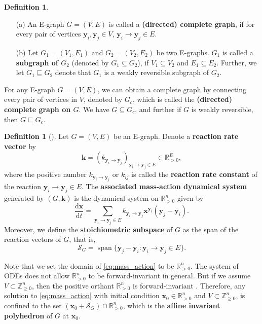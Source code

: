 \documentclass[11pt]{article}
\theoremstyle{plain}
\theoremstyle{definition}
\newtheorem{definition}[theorem]{Definition}
\theoremstyle{remark}
\newcommand\RR{\mathbb{R}}
\newcommand\by{\boldsymbol{y}}
\newcommand\bk{\boldsymbol{k}}
\newcommand\bx{\boldsymbol{x}}
\newcommand{\mSG}{\mathcal{S}_G}
\newcommand{\defi}{\textbf}
\DeclareMathOperator{\spn}{span}
\begin{document}
\begin{definition}
\begin{enumerate}
\item[(a)] An E-graph $G=(V, E)$ is called a \defi{(directed) complete graph}, if for every pair of vertices $\by_i, \by_j \in V$, $\by_i \rightarrow \by_j \in E$. 

\item[(b)] 
Let $G_1 = (V_1, E_1)$ and $G_2 = (V_2, E_2)$ be two E-graphs. 
$G_1$ is called a \defi{subgraph of $G_2$} (denoted by $G_1 \subseteq G_2$), if $V_1 \subseteq V_2$ and $E_1 \subseteq E_2$. 
Further, we let $G_1 \sqsubseteq G_2$ denote that $G_1$ is a weakly reversible subgraph of $G_2$.
\end{enumerate}
\end{definition}

For any E-graph $G=(V, E)$, we can obtain a complete graph by connecting every pair of vertices in $V$, denoted by $G_c$, which is called the \defi{(directed) complete graph on $G$}.
We have $G \subseteq G_c$, and further if $G$ is weakly reversible, then $G \sqsubseteq G_c$.

\begin{definition}[\cite{yu2018mathematical,feinberg1979lectures}]
Let $G=(V, E)$ be an E-graph. 
Denote a \defi{reaction rate vector} by 
$$
\bk = (k_{\by_i \rightarrow \by_j})_{\by_i \rightarrow \by_j \in E} \in \mathbb{R}_{>0}^{E},
$$
where the positive number $k_{\by_i \rightarrow \by_j}$ or $k_{ij}$ is called the \defi{reaction rate constant} of the reaction $\by_i \rightarrow \by_j \in E$. The \defi{associated mass-action dynamical system} generated by $(G, \bk)$ is the dynamical system on  $\RR_{>0}^n$ given by
\begin{equation} \label{eq:mass_action}
 \frac{\mathrm{d} \bx}{\mathrm{d} t} 
= \sum_{\by_i \rightarrow \by_j \in E}k_{\by_i \rightarrow \by_j} \bx^{\by_i}(\by_j - \by_i).
\end{equation}
Moreover, we define the \defi{stoichiometric subspace} of $G$ as the span of the reaction vectors  of $G$, that is, 
\begin{equation}
\mSG = \spn \{ \by_j - \by_i: \by_i \rightarrow \by_j \in E \}.
\end{equation}
\end{definition}

Note that we set the domain of \eqref{eq:mass_action} to be $\mathbb{R}_{>0}^n$.  The system of ODEs does not allow
$\mathbb{R}_{>0}^n$ to be forward-invariant in general. But if we assume $V \subset \mathbb{Z}_{\geq 0}^n$, then the positive orthant $\mathbb{R}_{>0}^n$ is forward-invariant \cite{sontag2001structure}. 
Therefore, any solution to \eqref{eq:mass_action} with initial condition $\bx_0 \in \mathbb{R}_{>0}^n$ and $V \subset \mathbb{Z}_{\geq 0}^n$, is confined to the set $(\bx_0 + \mSG)\cap \mathbb{R}_{>0}^n$, which is  the \defi{affine invariant polyhedron} of $G$ at $\bx_0$.
\end{document}

